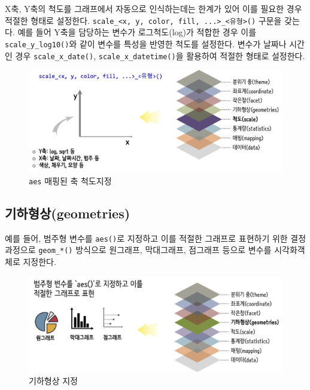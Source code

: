 \documentclass[
]{book}
\begin{document}
X축, Y축의 척도를 그래프에서 자동으로 인식하는데는 한계가 있어 이를 필요한 경우 적절한 형태로 설정한다. \texttt{scale\_\textless{}x,\ y,\ color,\ fill,\ ...\textgreater{}\_\textless{}유형\textgreater{}()} 구문을 갖는다. 예를 들어 Y축을 담당하는 변수가 로그척도(log)가 적합한 경우 이를 \texttt{scale\_y\_log10()}와 같이 변수를 특성을 반영한 척도를 설정한다. 변수가 날짜나 시간인 경우 \texttt{scale\_x\_date()}, \texttt{scale\_x\_datetime()}을 활용하여 적절한 형태로 설정한다.

\begin{figure}
\centering
\includegraphics[width=1\textwidth,height=\textheight]{assets/images/ggplot-scales.png}
\caption{\texttt{aes} 매핑된 축 척도지정}
\end{figure}

\hypertarget{ggplot2-steps-geometries}{%
\subsection{기하형상(geometries)}\label{ggplot2-steps-geometries}}

예를 들어, 범주형 변수를 \texttt{aes()}로 지정하고 이를 적절한 그래프로 표현하기 위한 결정과정으로 \texttt{geom\_*()} 방식으로 원그래프, 막대그래프, 점그래프 등으로 변수를 시각화객체로 지정한다.

\begin{figure}
\centering
\includegraphics[width=1\textwidth,height=\textheight]{assets/images/ggplot-geometries.png}
\caption{기하형상 지정}
\end{figure}
\end{document}
